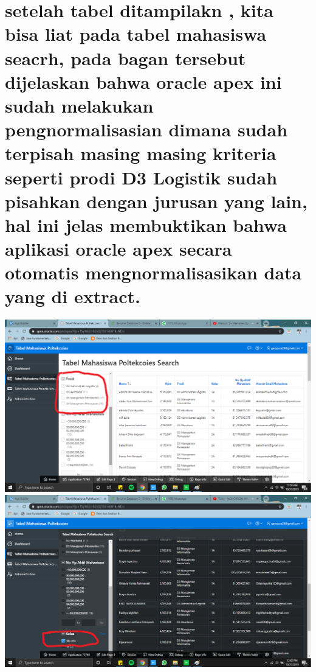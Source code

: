 \documentclass{article}
\begin{document}
\section{setelah tabel ditampilakn , kita bisa liat pada tabel mahasiswa seacrh, pada bagan tersebut dijelaskan bahwa oracle apex ini sudah melakukan pengnormalisasian dimana sudah terpisah masing masing kriteria seperti prodi D3 Logistik sudah pisahkan dengan jurusan yang lain, hal ini jelas membuktikan bahwa aplikasi oracle apex secara otomatis mengnormalisasikan data yang di extract. }
\begin{center}
    \includegraphics[width=.6\textwidth]{gambar/duabelas.png}
    \includegraphics[width=.6\textwidth]{gambar/tigabelas.png}
\end{center}
\end{document}
